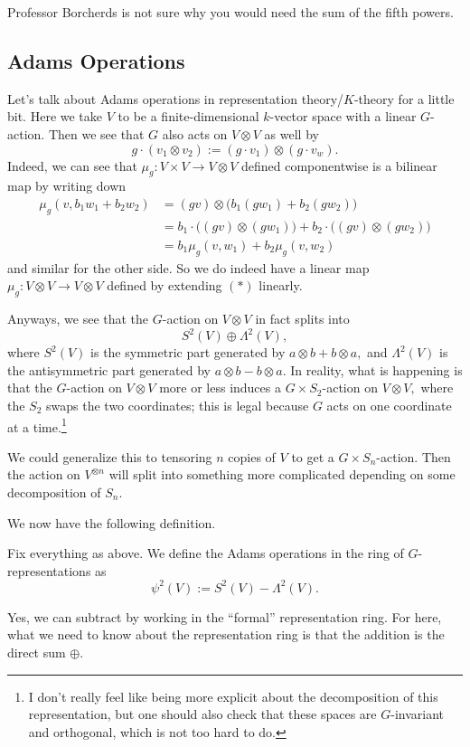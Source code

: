 \begin{remark}
	Professor Borcherds is not sure why you would need the sum of the fifth powers.
\end{remark}

\subsection{Adams Operations}
Let's talk about Adams operations in representation theory/$K$-theory for a little bit. Here we take $V$ to be a finite-dimensional $k$-vector space with a linear $G$-action. Then we see that $G$ also acts on $V\otimes V$ as well by
\[g\cdot(v_1\otimes v_2):=(g\cdot v_1)\otimes(g\cdot v_w).\tag{$*$}\]
Indeed, we can see that $\mu_g:V\times V\to V\otimes V$ defined componentwise is a bilinear map by writing down
\begin{align*}
	\mu_g(v,b_1w_1+b_2w_2) &= (gv)\otimes\big(b_1(gw_1)+b_2(gw_2)\big) \\
	&= b_1\cdot\big((gv)\otimes(gw_1)\big)+b_2\cdot\big((gv)\otimes(gw_2)\big) \\
	&= b_1\mu_g(v,w_1)+b_2\mu_g(v,w_2)
\end{align*}
and similar for the other side. So we do indeed have a linear map $\mu_g:V\otimes V\to V\otimes V$ defined by extending $(*)$ linearly. 

Anyways, we see that the $G$-action on $V\otimes V$ in fact splits into
\[S^2(V)\oplus\Lambda^2(V),\]
where $S^2(V)$ is the symmetric part generated by $a\otimes b+b\otimes a,$ and $\Lambda^2(V)$ is the antisymmetric part generated by $a\otimes b-b\otimes a.$ In reality, what is happening is that the $G$-action on $V\otimes V$ more or less induces a $G\times S_2$-action on $V\otimes V,$ where the $S_2$ swaps the two coordinates; this is legal because $G$ acts on one coordinate at a time.\footnote{I don't really feel like being more explicit about the decomposition of this representation, but one should also check that these spaces are $G$-invariant and orthogonal, which is not too hard to do.}
\begin{remark}
	We could generalize this to {tensor}ing $n$ copies of $V$ to get a $G\times S_n$-action. Then the action on $V^{\otimes n}$ will split into something more complicated depending on some decomposition of $S_n.$
\end{remark}
We now have the following definition.
\begin{definition}
	Fix everything as above. We define the Adams operations in the ring of $G$-representations as
	\[\psi^2(V):=S^2(V)-\Lambda^2(V).\]
\end{definition}
Yes, we can subtract by working in the ``formal'' representation ring. For here, what we need to know about the representation ring is that the addition is the direct sum $\oplus.$

